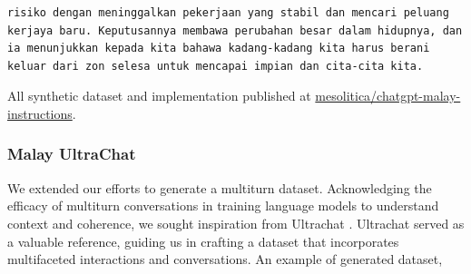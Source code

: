 \documentclass[preprint]{article}
\begin{document}
\begin{lstlisting}[breaklines=true]
risiko dengan meninggalkan pekerjaan yang stabil dan mencari peluang kerjaya baru. Keputusannya membawa perubahan besar dalam hidupnya, dan ia menunjukkan kepada kita bahawa kadang-kadang kita harus berani keluar dari zon selesa untuk mencapai impian dan cita-cita kita.
\end{lstlisting}

All synthetic dataset and implementation published at \href{https://huggingface.co/datasets/mesolitica/chatgpt-malay-instructions}{mesolitica/chatgpt-malay-instructions}.

\subsubsection{Malay UltraChat}

We extended our efforts to generate a multiturn dataset. Acknowledging the efficacy of multiturn conversations in training language models to understand context and coherence, we sought inspiration from Ultrachat \cite{ding2023enhancing}. Ultrachat served as a valuable reference, guiding us in crafting a dataset that incorporates multifaceted interactions and conversations. An example of generated dataset,
\end{document}
